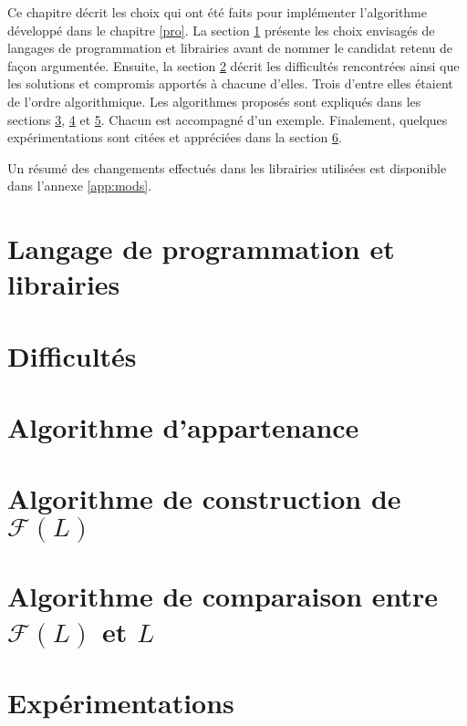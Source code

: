 Ce chapitre décrit les choix qui ont été faits pour implémenter l'algorithme développé dans le chapitre \ref{pro}. La section \ref{sec:lprog} présente les choix envisagés de langages de programmation et librairies avant de nommer le candidat retenu de façon argumentée.
Ensuite, la section \ref{sec:diffs} décrit les difficultés rencontrées ainsi que les solutions et compromis apportés à chacune d'elles. Trois d'entre elles étaient de l'ordre algorithmique. Les algorithmes proposés sont expliqués dans les sections \ref{sec:app}, \ref{sec:fl} et \ref{sec:fll}. Chacun est accompagné d'un exemple.
Finalement, quelques expérimentations sont citées et appréciées dans la section \ref{sec:exps}.

Un résumé des changements effectués dans les librairies utilisées est disponible dans l'annexe \ref{app:mods}.

\section{Langage de programmation et librairies}\label{sec:lprog}
\section{Difficultés}\label{sec:diffs}
\section{Algorithme d'appartenance}\label{sec:app}
\section{Algorithme de construction de $\mathcal{F}(L)$}\label{sec:fl}
\section{Algorithme de comparaison entre $\mathcal{F}(L)$ et $L$}\label{sec:fll}
\section{Expérimentations}\label{sec:exps}
